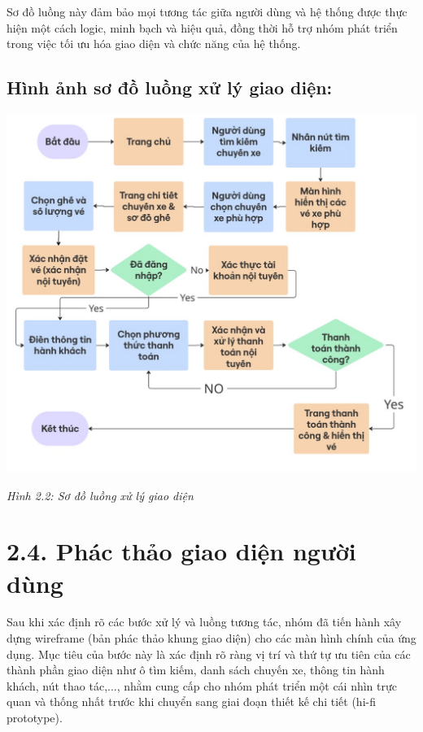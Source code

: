 Sơ đồ luồng này đảm bảo mọi tương tác giữa người dùng và hệ thống được thực hiện một cách logic, minh bạch và hiệu quả, đồng thời hỗ trợ nhóm phát triển trong việc tối ưu hóa giao diện và chức năng của hệ thống.

\subsection*{Hình ảnh sơ đồ luồng xử lý giao diện:}
\includegraphics[width=\textwidth]{assets/chart/user_flow.jpg}
\begin{center}
    \textit{Hình 2.2: Sơ đồ luồng xử lý giao diện}
\end{center}

\section*{2.4. Phác thảo giao diện người dùng}

Sau khi xác định rõ các bước xử lý và luồng tương tác, nhóm đã tiến hành xây dựng wireframe (bản phác thảo khung giao diện) cho các màn hình chính của ứng dụng. Mục tiêu của bước này là xác định rõ ràng vị trí và thứ tự ưu tiên của các thành phần giao diện như ô tìm kiếm, danh sách chuyến xe, thông tin hành khách, nút thao tác,..., nhằm cung cấp cho nhóm phát triển một cái nhìn trực quan và thống nhất trước khi chuyển sang giai đoạn thiết kế chi tiết (hi-fi prototype).